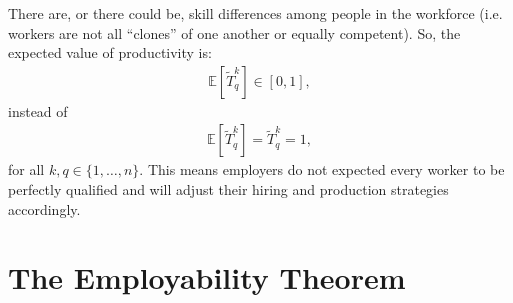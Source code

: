 \documentclass[hidelinks, nonatbib]{elsarticle}
\begin{document}
\begin{axiom}
    There are, or there could be, skill differences among people in the workforce (i.e. workers are not all ``clones'' of one another or equally competent). So, the expected value of productivity is:
    \begin{gather}
        \mathbb{E}[
            \tilde{T}_{q}^{k}
        ]
        \in
        [0,1]
        ,
    \end{gather}
    instead of 
    \begin{gather}
        \mathbb{E}[
            \tilde{T}_{q}^{k}
        ]
        =
        \tilde{T}_{q}^{k}
        = 1
        ,
    \end{gather}
    for all $k,q \in \{1, \dots, n\}$. This means employers do not expected every worker to be perfectly qualified and will adjust their hiring and production strategies accordingly.
\end{axiom}


\section{The Employability Theorem}
\end{document}
